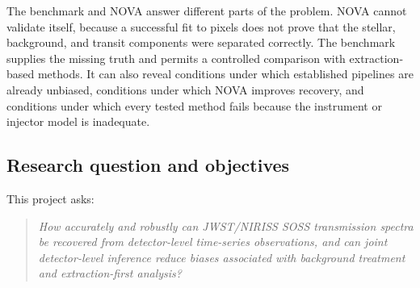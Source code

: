 
The benchmark and NOVA answer different parts of the problem. NOVA cannot
validate itself, because a successful fit to pixels does not prove that the
stellar, background, and transit components were separated correctly. The
benchmark supplies the missing truth and permits a controlled comparison with
extraction-based methods. It can also reveal conditions under which established
pipelines are already unbiased, conditions under which NOVA improves recovery,
and conditions under which every tested method fails because the instrument or
injector model is inadequate.

\subsection{Research question and objectives}
\label{sec:research-question}


This project asks:
\begin{quote}
\raggedright\itshape
How accurately and robustly can JWST/NIRISS SOSS transmission spectra
be recovered from detector-level time-series observations, and can joint
detector-level inference reduce biases associated with background treatment and
extraction-first analysis?
\end{quote}


